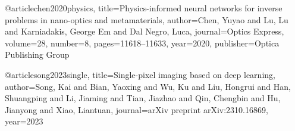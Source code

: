 @article{chen2020physics,
  title={Physics-informed neural networks for inverse problems in nano-optics and metamaterials},
  author={Chen, Yuyao and Lu, Lu and Karniadakis, George Em and Dal Negro, Luca},
  journal={Optics Express},
  volume={28},
  number={8},
  pages={11618--11633},
  year={2020},
  publisher={Optica Publishing Group}
}

@article{song2023single,
  title={Single-pixel imaging based on deep learning},
  author={Song, Kai and Bian, Yaoxing and Wu, Ku and Liu, Hongrui and Han, Shuangping and Li, Jiaming and Tian, Jiazhao and Qin, Chengbin and Hu, Jianyong and Xiao, Liantuan},
  journal={arXiv preprint arXiv:2310.16869},
  year={2023}
}
